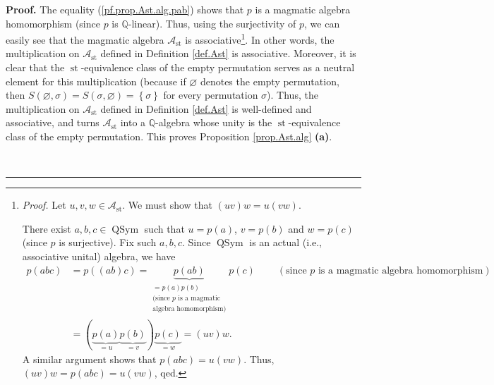 \documentclass[numbers=enddot,12pt,final,onecolumn,notitlepage]{scrartcl}%
\theoremstyle{definition}
\newenvironment{proof}[1][Proof]{\noindent\textbf{#1.} }{\ \rule{0.5em}{0.5em}}
\newenvironment{verlong}{}{}
\begin{document}
\begin{verlong}
\begin{proof}
The equality (\ref{pf.prop.Ast.alg.pab}) shows that $p$ is a magmatic algebra
homomorphism (since $p$ is $\mathbb{Q}$-linear). Thus, using the surjectivity
of $p$, we can easily see that the magmatic algebra $\mathcal{A}%
_{\operatorname*{st}}$ is associative\footnote{\textit{Proof.} Let
$u,v,w\in\mathcal{A}_{\operatorname*{st}}$. We must show that $\left(
uv\right)  w=u\left(  vw\right)  $.
\par
There exist $a,b,c\in\operatorname*{QSym}$ such that $u=p\left(  a\right)  $,
$v=p\left(  b\right)  $ and $w=p\left(  c\right)  $ (since $p$ is surjective).
Fix such $a,b,c$. Since $\operatorname*{QSym}$ is an actual (i.e., associative
unital) algebra, we have%
\begin{align*}
p\left(  abc\right)   &  =p\left(  \left(  ab\right)  c\right)
=\underbrace{p\left(  ab\right)  }_{\substack{=p\left(  a\right)  p\left(
b\right)  \\\text{(since }p\text{ is a magmatic}\\\text{algebra homomorphism)}%
}}p\left(  c\right)  \ \ \ \ \ \ \ \ \ \ \left(  \text{since }p\text{ is a
magmatic algebra homomorphism}\right) \\
&  =\left(  \underbrace{p\left(  a\right)  }_{=u}\underbrace{p\left(
b\right)  }_{=v}\right)  \underbrace{p\left(  c\right)  }_{=w}=\left(
uv\right)  w.
\end{align*}
A similar argument shows that $p\left(  abc\right)  =u\left(  vw\right)  $.
Thus, $\left(  uv\right)  w=p\left(  abc\right)  =u\left(  vw\right)  $,
qed.}. In other words, the multiplication on $\mathcal{A}_{\operatorname*{st}%
}$ defined in Definition \ref{def.Ast} is associative. Moreover, it is clear
that the $\operatorname*{st}$-equivalence class of the empty permutation
serves as a neutral element for this multiplication (because if $\varnothing$
denotes the empty permutation, then $S\left(  \varnothing,\sigma\right)
=S\left(  \sigma,\varnothing\right)  =\left\{  \sigma\right\}  $ for every
permutation $\sigma$). Thus, the multiplication on $\mathcal{A}%
_{\operatorname*{st}}$ defined in Definition \ref{def.Ast} is well-defined and
associative, and turns $\mathcal{A}_{\operatorname*{st}}$ into a $\mathbb{Q}%
$-algebra whose unity is the $\operatorname*{st}$-equivalence class of the
empty permutation. This proves Proposition \ref{prop.Ast.alg} \textbf{(a)}.


\end{proof}
\end{verlong}
\end{document}
